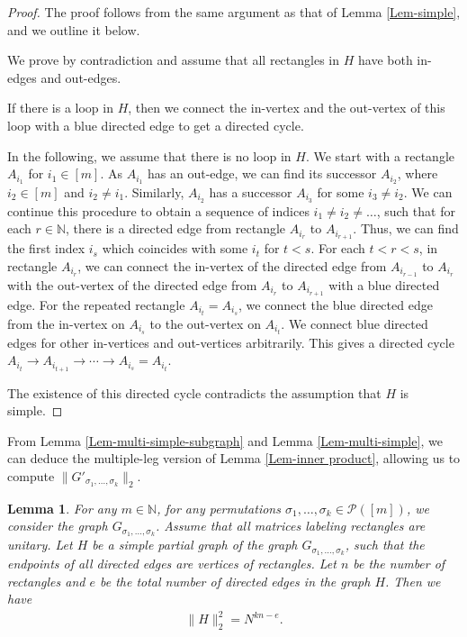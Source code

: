 \documentclass[12pt]{article}
\numberwithin{equation}{section}
\theoremstyle{plain}
\newtheorem{lemma}[theorem]{Lemma}
\def\bN{\mathbb N}
\def\cP{\mathcal P}
\begin{document}
\begin{proof}
The proof follows from the same argument as that of Lemma \ref{Lem-simple}, and we outline it below.

We prove by contradiction and assume that all rectangles in $H$ have both in-edges and out-edges.

If there is a loop in $H$, then we connect the in-vertex and the out-vertex of this loop with a blue directed edge to get a directed cycle.

In the following, we assume that there is no loop in $H$.
We start with a rectangle $A_{i_1}$ for $i_1 \in [m]$.
As $A_{i_1}$ has an out-edge, we can find its successor $A_{i_2}$, where $i_2 \in [m]$ and $i_2 \not= i_1$.
Similarly, $A_{i_2}$ has a successor $A_{i_3}$ for some $i_3 \not= i_2$.
We can continue this procedure to obtain a sequence of indices $i_1 \not= i_2 \not= \ldots$, such that for each $r \in \bN$, there is a directed edge from rectangle $A_{i_r}$ to $A_{i_{r+1}}$.
Thus, we can find the first index $i_s$ which coincides with some $i_t$ for $t<s$.
For each $t<r<s$, in rectangle $A_{i_r}$, we can connect the in-vertex of the directed edge from $A_{i_{r-1}}$ to $A_{i_r}$ with the out-vertex of the directed edge from $A_{i_r}$ to $A_{i_{r+1}}$ with a blue directed edge. 
For the repeated rectangle $A_{i_t}=A_{i_s}$, we connect the blue directed edge from the in-vertex on $A_{i_s}$ to the out-vertex on $A_{i_t}$.
We connect blue directed edges for other in-vertices and out-vertices arbitrarily. This gives a directed cycle $A_{i_t}\to A_{i_{t+1}}\to\cdots\to A_{i_s}=A_{i_t}$.

The existence of this directed cycle contradicts the assumption that $H$ is simple.
\end{proof}

From Lemma \ref{Lem-multi-simple-subgraph} and Lemma \ref{Lem-multi-simple}, we can deduce the multiple-leg version of Lemma \ref{Lem-inner product}, allowing us to compute $\|G'_{\sigma_1,\ldots,\sigma_k}\|_2$.

\begin{lemma} \label{Lem-multi-inner product}
For any $m \in \bN$, for any permutations $\sigma_1,\ldots,\sigma_k \in \cP([m])$, we consider the graph $G_{\sigma_1,\ldots,\sigma_k}$. Assume that all matrices labeling rectangles are unitary. Let $H$ be a simple partial graph of the graph $G_{\sigma_1,\ldots,\sigma_k}$, such that the endpoints of all directed edges are vertices of rectangles. Let $n$ be the number of rectangles and $e$ be the total number of directed edges in the graph $H$. Then we have
\begin{align*}
    \|H\|_2^2 = N^{kn-e}.
\end{align*}
\end{lemma}
\end{document}
